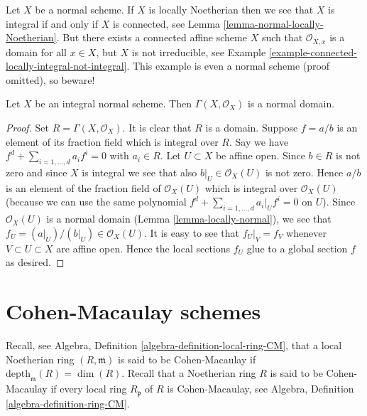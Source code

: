 \begin{remark}
\label{remark-normal-connected-irreducible}
Let $X$ be a normal scheme. If $X$ is locally Noetherian then we see that
$X$ is integral if and only if $X$ is connected, see
Lemma \ref{lemma-normal-locally-Noetherian}.
But there exists a connected affine scheme $X$ such that
$\mathcal{O}_{X, x}$ is a domain for all $x \in X$, but $X$ is not
irreducible, see
Example \ref{example-connected-locally-integral-not-integral}.
This example is even a normal scheme (proof omitted), so beware!
\end{remark}

\begin{lemma}
\label{lemma-normal-integral-sections}
Let $X$ be an integral normal scheme.
Then $\Gamma(X, \mathcal{O}_X)$ is a normal domain.
\end{lemma}

\begin{proof}
Set $R = \Gamma(X, \mathcal{O}_X)$.
It is clear that $R$ is a domain.
Suppose $f = a/b$ is an element of its fraction field
which is integral over $R$. Say we have
$f^d + \sum_{i = 1, \ldots, d} a_i f^i = 0$ with
$a_i \in R$. Let $U \subset X$ be affine open.
Since $b \in R$ is not zero and since $X$ is integral we see
that also $b|_U \in \mathcal{O}_X(U)$ is not zero.
Hence $a/b$ is an element of the fraction field of
$\mathcal{O}_X(U)$ which is integral over $\mathcal{O}_X(U)$
(because we can use the same polynomial
$f^d + \sum_{i = 1, \ldots, d} a_i|_U f^i = 0$ on $U$).
Since $\mathcal{O}_X(U)$ is a normal domain
(Lemma \ref{lemma-locally-normal}), we see that
$f_U = (a|_U)/(b|_U) \in \mathcal{O}_X(U)$. It is easy to
see that $f_U|_V = f_V$ whenever $V \subset U \subset X$ are
affine open. Hence the local sections $f_U$ glue to a global
section $f$ as desired.
\end{proof}










\section{Cohen-Macaulay schemes}
\label{section-Cohen-Macaulay}

\noindent
Recall, see Algebra, Definition \ref{algebra-definition-local-ring-CM},
that a local Noetherian ring $(R, \mathfrak m)$ is
said to be Cohen-Macaulay if $\text{depth}_{\mathfrak m}(R) = \dim(R)$.
Recall that a Noetherian ring $R$ is said to be Cohen-Macaulay if
every local ring $R_{\mathfrak p}$ of $R$ is Cohen-Macaulay,
see Algebra, Definition \ref{algebra-definition-ring-CM}.

